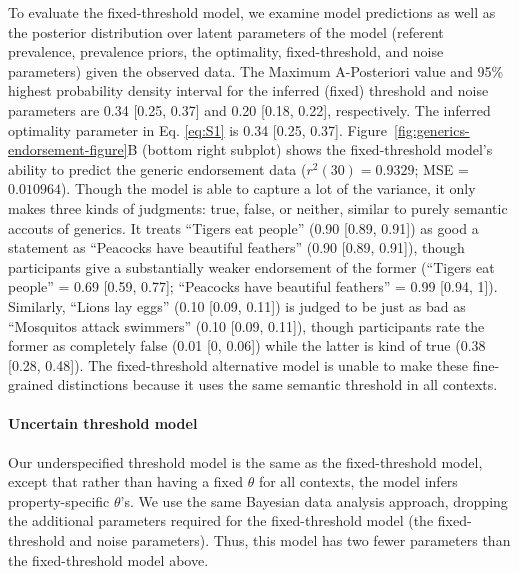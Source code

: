 \documentclass[english,,man,floatsintext]{apa6}
\let\oldparagraph\paragraph
\renewcommand{\paragraph}[1]{\oldparagraph{#1}\mbox{}}
\theoremstyle{definition}
\theoremstyle{definition}
\theoremstyle{definition}
\theoremstyle{remark}
\begin{document}
To evaluate the fixed-threshold model, we examine model predictions as
well as the posterior distribution over latent parameters of the model
(referent prevalence, prevalence priors, the optimality,
fixed-threshold, and noise parameters) given the observed data. The
Maximum A-Posteriori value and 95\% highest probability density interval
for the inferred (fixed) threshold and noise parameters are 0.34
{[}0.25, 0.37{]} and 0.20 {[}0.18, 0.22{]}, respectively. The inferred
optimality parameter in Eq. \ref{eq:S1} is 0.34 {[}0.25, 0.37{]}.
Figure~\ref{fig:generics-endorsement-figure}B (bottom right subplot)
shows the fixed-threshold model's ability to predict the generic
endorsement data (\(r^2(30) = 0.9329\); MSE = \(0.010964\)). Though the
model is able to capture a lot of the variance, it only makes three
kinds of judgments: true, false, or neither, similar to purely semantic
accouts of generics. It treats \enquote{Tigers eat people} (0.90
{[}0.89, 0.91{]}) as good a statement as \enquote{Peacocks have
beautiful feathers} (0.90 {[}0.89, 0.91{]}), though participants give a
substantially weaker endorsement of the former (\enquote{Tigers eat
people} = 0.69 {[}0.59, 0.77{]}; \enquote{Peacocks have beautiful
feathers} = 0.99 {[}0.94, 1{]}). Similarly, \enquote{Lions lay eggs}
(0.10 {[}0.09, 0.11{]}) is judged to be just as bad as
\enquote{Mosquitos attack swimmers} (0.10 {[}0.09, 0.11{]}), though
participants rate the former as completely false (0.01 {[}0, 0.06{]})
while the latter is kind of true (0.38 {[}0.28, 0.48{]}). The
fixed-threshold alternative model is unable to make these fine-grained
distinctions because it uses the same semantic threshold in all
contexts.

\hypertarget{uncertain-threshold-model}{%
\paragraph{Uncertain threshold model}\label{uncertain-threshold-model}}

Our underspecified threshold model is the same as the fixed-threshold
model, except that rather than having a fixed \(\theta\) for all
contexts, the model infers property-specific \(\theta\)'s. We use the
same Bayesian data analysis approach, dropping the additional parameters
required for the fixed-threshold model (the fixed-threshold and noise
parameters). Thus, this model has two fewer parameters than the
fixed-threshold model above.
\end{document}
